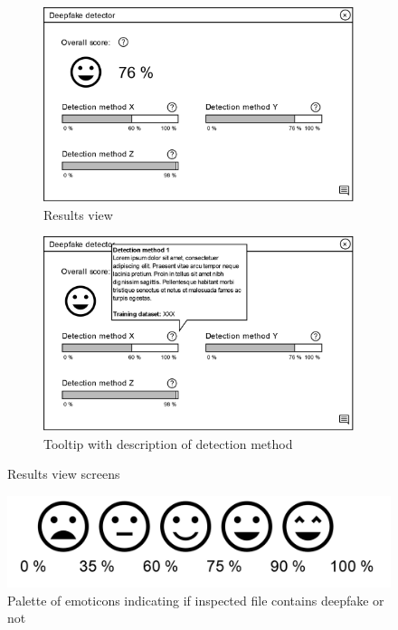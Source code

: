 \begin{figure}[H]
    \begin{subfigure}[h]{.498\linewidth}
        \centering
        \includegraphics[width=1\linewidth]{other-fig/client_wireframe_results.png}
        \caption{Results view}
    \end{subfigure}
    \hfill
    \begin{subfigure}[h]{.498\linewidth}
        \centering
        \includegraphics[width=1\linewidth]{other-fig/client_wireframe_results2.png}
        \caption{Tooltip with description of detection method}
    \end{subfigure} 
    \caption{Results view screens}
    \label{fig:client_wireframe_results}
\end{figure}

\begin{figure}[H]
    \centering
    \includegraphics[width=.5\linewidth]{other-fig/client_wireframe_results3.png}
    \caption{Palette of emoticons indicating if inspected file contains deepfake or not}
    \label{fig:client_wireframe_results3}
\end{figure}

